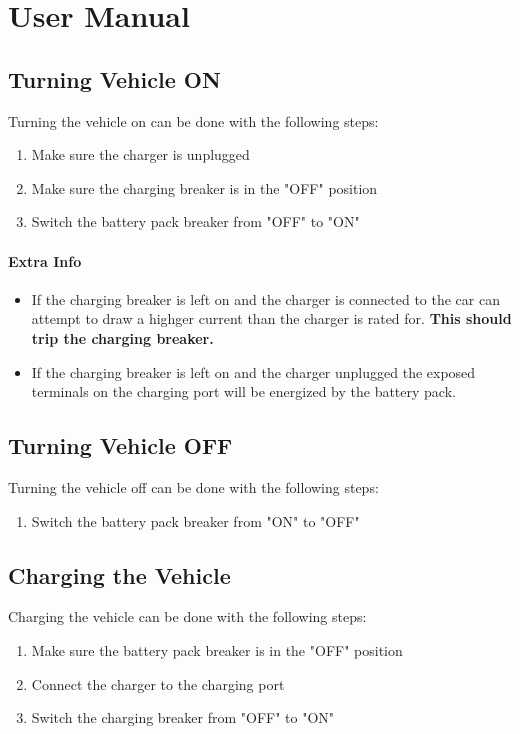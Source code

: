\section{User Manual}

\subsection{Turning Vehicle ON}
Turning the vehicle on can be done with the following steps:
\begin{enumerate}
  \item Make sure the charger is unplugged
  \item Make sure the charging breaker is in the "OFF" position
  \item Switch the battery pack breaker from "OFF" to "ON"
\end{enumerate}
\paragraph{Extra Info}
\begin{itemize}
  \item If the charging breaker is left on and the charger is connected to the car can attempt to draw a highger current than the charger is rated for. \textbf{This should trip the charging breaker.}
  \item If the charging breaker is left on and the charger unplugged the exposed terminals on the charging port will be energized by the battery pack.
\end{itemize}

\subsection{Turning Vehicle OFF}
Turning the vehicle off can be done with the following steps:
\begin{enumerate}
  \item Switch the battery pack breaker from "ON" to "OFF"
\end{enumerate}

\subsection{Charging the Vehicle}
Charging the vehicle can be done with the following steps:
\begin{enumerate}
  \item Make sure the battery pack breaker is in the "OFF" position
  \item Connect the charger to the charging port
  \item Switch the charging breaker from "OFF" to "ON"
\end{enumerate}
